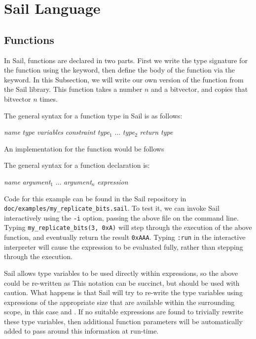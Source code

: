 \section{Sail Language}

\subsection{Functions}
\label{sec:functions}



In Sail, functions are declared in two parts. First we write the type
signature for the function using the  keyword, then define the
body of the function via the  keyword. In this
Subsection, we will write our own version of the 
function from the Sail library. This function takes a number $n$ and a
bitvector, and copies that bitvector $n$ times.


\noindent The general syntax for a function type in Sail is as follows:
\begin{center}
   \textit{name} \ll{:}  \textit{type variables} \ll{,} \textit{constraint}  \textit{type$_1$} \ll{,} $\ldots$ \ll{,} \textit{type$_2$} \ll{)} \ll{->} \textit{return type}
\end{center}
An implementation for the  function would be
follows 

The general syntax for a function declaration is:
\begin{center}
   \textit{name} \ll{(} \textit{argument$_1$} \ll{,} $\ldots$ \ll{,} \textit{argument$_n$} \ll{)} \ll{=} \textit{expression}
\end{center}

Code for this example can be found in
the Sail repository in \verb|doc/examples/my_replicate_bits.sail|. To
test it, we can invoke Sail interactively using the \verb|-i| option,
passing the above file on the command line. Typing
\verb|my_replicate_bits(3, 0xA)| will step through the execution of the
above function, and eventually return the result \verb|0xAAA|. Typing
\verb|:run| in the interactive interpreter will cause the expression
to be evaluated fully, rather than stepping through the execution.

Sail allows type variables to be used directly within expressions, so
the above could be re-written as  This
notation can be succinct, but should be used with caution. What
happens is that Sail will try to re-write the type variables using
expressions of the appropriate size that are available within the
surrounding scope, in this case  and . If no
suitable expressions are found to trivially rewrite these type
variables, then additional function parameters will be automatically
added to pass around this information at run-time.

